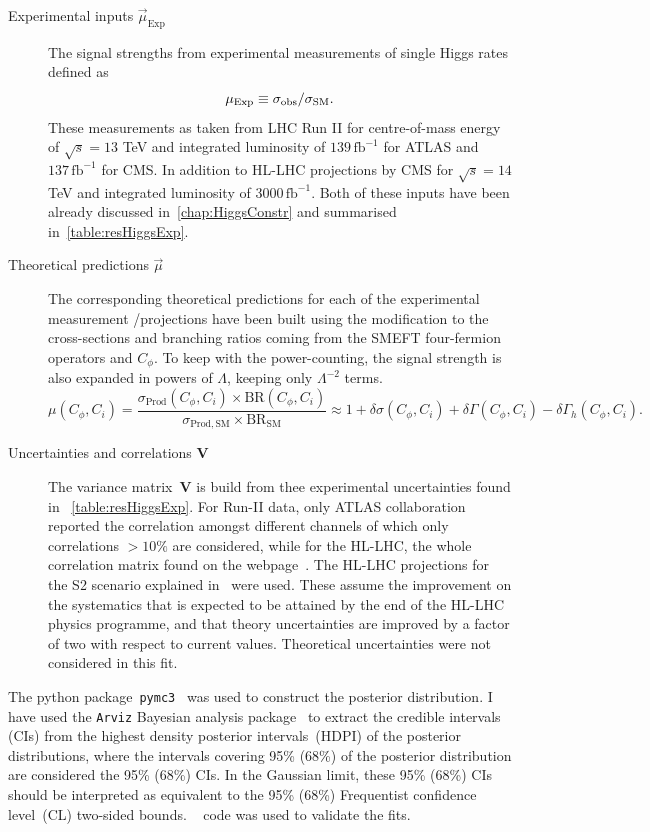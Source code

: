 	\begin{description}
		\item[Experimental inputs $\vec{\mu}_{\mathrm{Exp}}$ ] The signal strengths from experimental measurements of single Higgs rates defined as
		\begin{equation}
			\mu_{\mathrm{Exp}}\equiv \sigma_{\mathrm{obs}}/\sigma_{\mathrm{SM}}.
		\end{equation}
		These measurements as taken from LHC Run II for centre-of-mass energy of $\sqrt{s} = 13$ TeV and  integrated luminosity of $ 139\, \mathrm{fb}^{-1}$ for ATLAS and  $ 137\,\mathrm{fb}^{-1}$ for CMS. In addition to HL-LHC projections by CMS for $\sqrt{s} = 14$ TeV and integrated luminosity of $ 3000\, \mathrm{fb}^{-1}$. Both of these inputs have been already discussed in~\autoref{chap:HiggsConstr} and summarised in~\autoref{table:resHiggsExp}.
		\item [Theoretical predictions $\vec{\mu}$ ]  The corresponding theoretical predictions for each of the experimental measurement /projections have been built using the modification to the cross-sections and branching ratios coming from the SMEFT four-fermion operators and $C_\phi$. To keep with the power-counting, the signal strength is also expanded in powers of $\Lambda$, keeping only $ \Lambda^{-2}$ terms. 
		\begin{equation}
			\mu(C_\phi,C_i)=\frac{\sigma_\mathrm{ Prod}(C_\phi,C_i) \times \mathrm{ BR}(C_\phi,C_i)}{\sigma_\mathrm{ Prod, SM}\times \mathrm{BR}_\mathrm{ SM}} \approx 1+\delta \sigma(C_\phi,C_i)+\delta\Gamma(C_\phi,C_i)-\delta \Gamma_h(C_\phi,C_i).
			\label{linear-mu}
		\end{equation}
		\item [Uncertainties and correlations $\mathbf{V}$ ]  The variance matrix~$\mathbf{V}$ is build from thee experimental uncertainties found in ~\autoref{table:resHiggsExp}. For Run-II data, only ATLAS collaboration reported the correlation amongst different channels of which only correlations $> 10\%$ are considered, while for the HL-LHC, the whole correlation matrix found on the webpage~\cite{twiki}.  The HL-LHC projections for the S2 scenario explained in~\cite{Cepeda:2019klc} were used. These assume the improvement on the systematics that is expected to be attained by the end of the HL-LHC physics programme, and that theory uncertainties are improved by a factor of two with respect to current values. Theoretical uncertainties were not considered in this fit.
	\end{description}
	The python package~\texttt{pymc3}~\cite{Salvatier2016} was used to construct the posterior distribution. I have used the \texttt{Arviz} Bayesian analysis package~\cite{arviz_2019} to extract the credible intervals (CIs) from the highest density posterior intervals~(HDPI) of the posterior distributions, where the intervals covering 95\% (68\%) of the posterior distribution are considered the 95\% (68\%) CIs. In the Gaussian limit, these  95\% (68\%) CIs should be interpreted as equivalent to the 95\%  (68\%) Frequentist  confidence level~(CL) two-sided bounds. \HEPfit~\cite{deBlas:2019okz} code was used to validate the fits.
